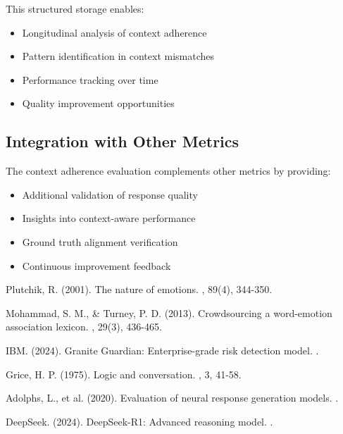 \documentclass[12pt]{article}
\begin{document}
This structured storage enables:
\begin{itemize}
    \item Longitudinal analysis of context adherence
    \item Pattern identification in context mismatches
    \item Performance tracking over time
    \item Quality improvement opportunities
\end{itemize}

\subsection{Integration with Other Metrics}

The context adherence evaluation complements other metrics by providing:
\begin{itemize}
    \item Additional validation of response quality
    \item Insights into context-aware performance
    \item Ground truth alignment verification
    \item Continuous improvement feedback
\end{itemize}

\begin{thebibliography}{9}
Plutchik, R. (2001).
\newblock The nature of emotions.
, 89(4), 344-350.

Mohammad, S. M., \& Turney, P. D. (2013).
\newblock Crowdsourcing a word-emotion association lexicon.
, 29(3), 436-465.

IBM. (2024).
\newblock Granite Guardian: Enterprise-grade risk detection model.
.

Grice, H. P. (1975).
\newblock Logic and conversation.
, 3, 41-58.

Adolphs, L., et al. (2020).
\newblock Evaluation of neural response generation models.
.

DeepSeek. (2024).
\newblock DeepSeek-R1: Advanced reasoning model.
.
\end{thebibliography}
\end{document}
